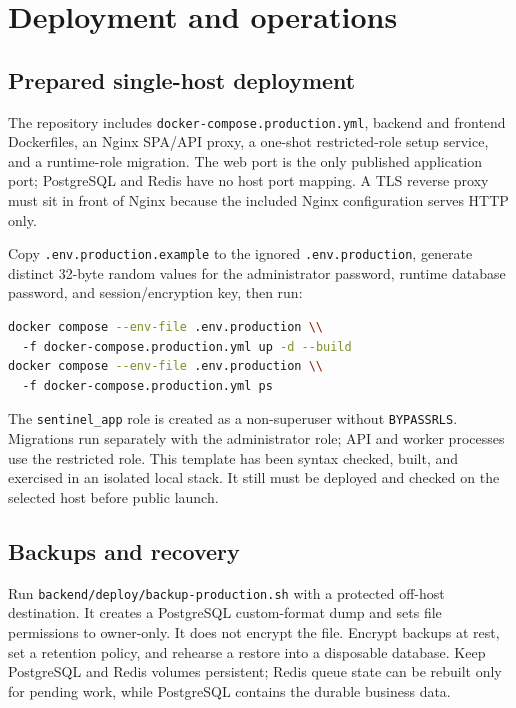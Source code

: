 \documentclass[11pt,a4paper]{article}
\begin{document}
\section{Deployment and operations}

\subsection{Prepared single-host deployment}
The repository includes \texttt{docker-compose.production.yml}, backend and
frontend Dockerfiles, an Nginx SPA/API proxy, a one-shot restricted-role setup
service, and a runtime-role migration. The web port is the only published application port;
PostgreSQL and Redis have no host port mapping. A TLS reverse proxy must sit in
front of Nginx because the included Nginx configuration serves HTTP only.

Copy \texttt{.env.production.example} to the ignored
\texttt{.env.production}, generate distinct 32-byte random values for the
administrator password, runtime database password, and session/encryption key,
then run:

\begin{lstlisting}[language=bash]
docker compose --env-file .env.production \\
  -f docker-compose.production.yml up -d --build
docker compose --env-file .env.production \\
  -f docker-compose.production.yml ps
\end{lstlisting}

The \texttt{sentinel\_app} role is created as a non-superuser without
\texttt{BYPASSRLS}. Migrations run separately with the administrator role; API
and worker processes use the restricted role. This template has been syntax
checked, built, and exercised in an isolated local stack. It still must be
deployed and checked on the selected host before public launch.

\subsection{Backups and recovery}
Run \texttt{backend/deploy/backup-production.sh} with a protected off-host
destination. It creates a PostgreSQL custom-format dump and sets file permissions
to owner-only. It does not encrypt the file. Encrypt backups at rest, set a
retention policy, and rehearse a restore into a disposable database. Keep
PostgreSQL and Redis volumes persistent; Redis queue state can be rebuilt only
for pending work, while PostgreSQL contains the durable business data.
\end{document}
